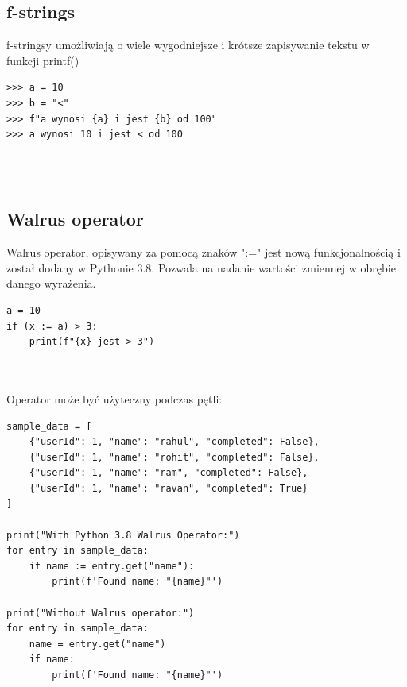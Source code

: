 \documentclass[a4paper, 12pt]{article}
\begin{document}
\subsection{f-strings}
f-stringsy umożliwiają o wiele wygodniejsze i krótsze zapisywanie tekstu w  \\ funkcji printf() 

\noindent\begin{minipage}{\linewidth}
\begin{lstlisting}[style=python]
>>> a = 10
>>> b = "<"
>>> f"a wynosi {a} i jest {b} od 100"
>>> a wynosi 10 i jest < od 100
\end{lstlisting}
\end{minipage}
\\ \\

\subsection{Walrus operator}
Walrus operator, opisywany za pomocą znaków ":=" jest nową funkcjonalnością i został dodany w Pythonie 3.8.
Pozwala na nadanie wartości zmiennej w obrębie danego wyrażenia.


\noindent\begin{minipage}{\linewidth}
\begin{lstlisting}[style=python]
a = 10
if (x := a) > 3:
    print(f"{x} jest > 3")
\end{lstlisting}
\end{minipage}
\\ \\
Operator może być użyteczny podczas pętli\cite{wal}:


\noindent\begin{minipage}{\linewidth}
\begin{lstlisting}[style=python]
sample_data = [
    {"userId": 1, "name": "rahul", "completed": False},
    {"userId": 1, "name": "rohit", "completed": False},
    {"userId": 1, "name": "ram", "completed": False},
    {"userId": 1, "name": "ravan", "completed": True}
]

print("With Python 3.8 Walrus Operator:")
for entry in sample_data:
    if name := entry.get("name"):
        print(f'Found name: "{name}"')

print("Without Walrus operator:")
for entry in sample_data:
    name = entry.get("name")
    if name:
        print(f'Found name: "{name}"')
\end{lstlisting}
\end{minipage}
\pagebreak
\end{document}
